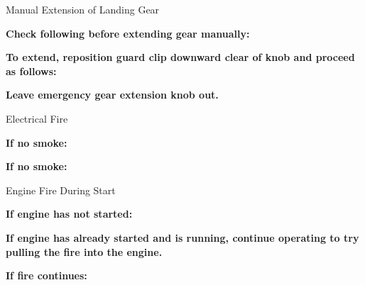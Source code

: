 \begin{checklist_emerg}{Manual Extension of Landing Gear}
    \begin{center}
        \textbf{Check following before extending gear manually:}
    \end{center}


    \begin{center}
        \textbf{To extend, reposition guard clip downward clear of knob and proceed as follows:}
    \end{center}


    \begin{center}
        \textbf{Leave emergency gear extension knob out.}
    \end{center}
\end{checklist_emerg}

\begin{checklist_emerg}{Electrical Fire}
    \begin{center}
        \textbf{If no smoke:}
    \end{center}
    \begin{center}
        \textbf{If no smoke:}
    \end{center}
\end{checklist_emerg}

\begin{checklist_emerg}{Engine Fire During Start}
    \begin{center}
        \textbf{If engine has not started:}
    \end{center}


    \begin{center}
        \textbf{If engine has already started and is running, continue operating to try pulling the fire into the engine.}
    \end{center}

    \begin{center}
        \textbf{If fire continues:}
    \end{center}

\end{checklist_emerg}

